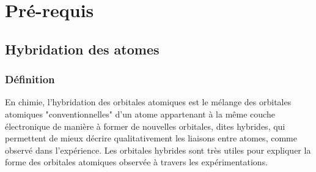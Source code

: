 
\chapter{Pré-requis}
\minitoc
\section{Hybridation des atomes}
\subsection{Définition}
En chimie, l'hybridation des orbitales atomiques est le mélange des orbitales atomiques "conventionnelles" d'un atome appartenant à la même couche électronique de manière à former de nouvelles orbitales, dites hybrides, qui permettent de mieux décrire qualitativement les liaisons entre atomes, comme observé dans l'expérience. Les orbitales hybrides sont très utiles pour expliquer la forme des orbitales atomiques observée à travers les expérimentations.
